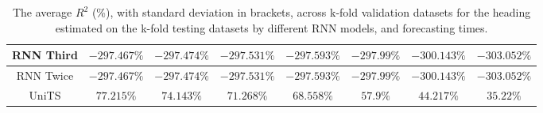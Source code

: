 \begin{table}[!ht]
{\begin{tabular}{|c|c|c|c|c|c|c|c|}
			RNN Third & $-297.467\%$ & $-297.474\%$ & $-297.531\%$ & $-297.593\%$ & $-297.99\%$ & $-300.143\%$ & $-303.052\%$ \\ \hline
			RNN Twice & $-297.467\%$ & $-297.474\%$ & $-297.531\%$ & $-297.593\%$ & $-297.99\%$ & $-300.143\%$ & $-303.052\%$ \\ \hline
			UniTS & $77.215\%$ & $74.143\%$ & $71.268\%$ & $\mathbf{68.558\%}$ & $\mathbf{57.9\%}$ & $\mathbf{44.217\%}$ & $\mathbf{35.22\%}$ \\ \hline
		\end{tabular}
	}
	\caption{The average $R^{2}$ (\%), with standard deviation in brackets, across k-fold validation datasets for the heading estimated on the k-fold testing datasets by different RNN models, and forecasting times.}
	\label{tab:all_direction_R2}
\end{table}

